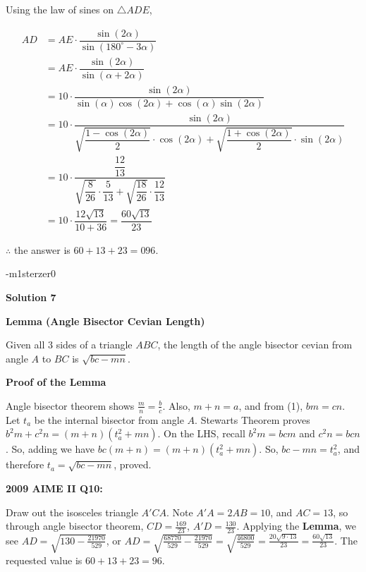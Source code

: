 \begin{enumerate}
 Using the law of sines on $\bigtriangleup ADE$, 

 
 \begin{align*} AD  &= AE \cdot \dfrac{\sin(2\alpha)}{\sin(180^\circ-3\alpha)}\\     &= AE \cdot \dfrac{\sin(2\alpha)}{\sin(\alpha+2\alpha)}\\     &= 10 \cdot \dfrac{\sin(2\alpha)}{\sin(\alpha)\cos(2\alpha)+\cos(\alpha)\sin(2\alpha)}\\     &= 10 \cdot \dfrac{\sin(2\alpha)}{\sqrt{\dfrac{1-\cos(2\alpha)}{2}}\cdot\cos(2\alpha)+\sqrt{\dfrac{1+\cos(2\alpha)}{2}}\cdot\sin(2\alpha)}\\     &= 10 \cdot \dfrac{\dfrac{12}{13}}{\sqrt{\dfrac{8}{26}}\cdot\dfrac{5}{13}+\sqrt{\dfrac{18}{26}}\cdot\dfrac{12}{13}}\\     &= 10 \cdot \dfrac{12\sqrt{13}}{10+36} = \dfrac{60\sqrt{13}}{23} \end{align*}

$\therefore$ the answer is $60+13+23=\boxed{096}$.

 -m1sterzer0

 



\textbf{Solution 7}

\textbf{Lemma (Angle Bisector Cevian Length)}

 Given all 3 sides of a triangle $ABC$, the length of the angle bisector cevian from angle $A$ to $BC$ is $\sqrt{bc-mn}$.

 \textbf{Proof of the Lemma}

 Angle bisector theorem shows $\frac{m}{n} = \frac{b}{c}$. Also, $m+n = a$, and from (1), $bm=cn$. Let $t_a$ be the internal bisector from angle $A$. Stewarts Theorem proves $b^2m+c^2n=(m+n)(t_a^2+mn)$. On the LHS, recall $b^2m = bcm$ and $c^2n = bcn$. So, adding we have $bc(m+n) = (m+n)(t_a^2 + mn)$. So, $bc - mn = t_a^2$, and therefore $t_a = \sqrt{bc - mn}$, proved.

 \textbf{2009 AIME II Q10:}

 Draw out the isosceles triangle $A'CA$. Note $A'A = 2AB = 10$, and $AC = 13$, so through angle bisector theorem, $CD = \frac{169}{23}$, $A'D = \frac{130}{23}$. Applying the \textbf{Lemma}, we see $AD = \sqrt{130 - \frac{21970}{529}}$, or $AD = \sqrt{\frac{68770}{529}- \frac{21970}{529}} = \sqrt{\frac{46800}{529}} = \frac{20\sqrt{9 \cdot 13}}{23} = \frac{60\sqrt{13}}{23}$. The requested value is $60+13+23 = \boxed{96}$.

 



\end{enumerate}
